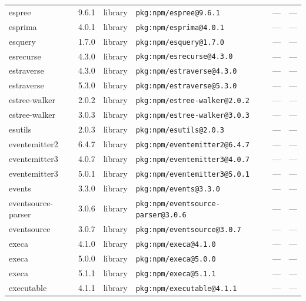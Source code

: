 \documentclass[11pt,a4paper]{article}
\begin{document}
\begin{longtable}{|p{4cm}|p{2cm}|p{1.6cm}|p{5cm}|p{1.5cm}|p{3.5cm}|}
\raggedright espree & 9.6.1 & library & \small\texttt{pkg:npm/espree@9.6.1} & — & \small — \\
\raggedright esprima & 4.0.1 & library & \small\texttt{pkg:npm/esprima@4.0.1} & — & \small — \\
\raggedright esquery & 1.7.0 & library & \small\texttt{pkg:npm/esquery@1.7.0} & — & \small — \\
\raggedright esrecurse & 4.3.0 & library & \small\texttt{pkg:npm/esrecurse@4.3.0} & — & \small — \\
\raggedright estraverse & 4.3.0 & library & \small\texttt{pkg:npm/estraverse@4.3.0} & — & \small — \\
\raggedright estraverse & 5.3.0 & library & \small\texttt{pkg:npm/estraverse@5.3.0} & — & \small — \\
\raggedright estree-walker & 2.0.2 & library & \small\texttt{pkg:npm/estree-walker@2.0.2} & — & \small — \\
\raggedright estree-walker & 3.0.3 & library & \small\texttt{pkg:npm/estree-walker@3.0.3} & — & \small — \\
\raggedright esutils & 2.0.3 & library & \small\texttt{pkg:npm/esutils@2.0.3} & — & \small — \\
\raggedright eventemitter2 & 6.4.7 & library & \small\texttt{pkg:npm/eventemitter2@6.4.7} & — & \small — \\
\raggedright eventemitter3 & 4.0.7 & library & \small\texttt{pkg:npm/eventemitter3@4.0.7} & — & \small — \\
\raggedright eventemitter3 & 5.0.1 & library & \small\texttt{pkg:npm/eventemitter3@5.0.1} & — & \small — \\
\raggedright events & 3.3.0 & library & \small\texttt{pkg:npm/events@3.3.0} & — & \small — \\
\raggedright eventsource-parser & 3.0.6 & library & \small\texttt{pkg:npm/eventsource-parser@3.0.6} & — & \small — \\
\raggedright eventsource & 3.0.7 & library & \small\texttt{pkg:npm/eventsource@3.0.7} & — & \small — \\
\raggedright execa & 4.1.0 & library & \small\texttt{pkg:npm/execa@4.1.0} & — & \small — \\
\raggedright execa & 5.0.0 & library & \small\texttt{pkg:npm/execa@5.0.0} & — & \small — \\
\raggedright execa & 5.1.1 & library & \small\texttt{pkg:npm/execa@5.1.1} & — & \small — \\
\raggedright executable & 4.1.1 & library & \small\texttt{pkg:npm/executable@4.1.1} & — & \small — \\

\end{longtable}
\end{document}
